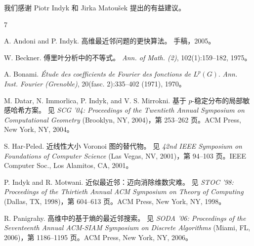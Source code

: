 \documentclass[10pt,twocolumn]{ctexart}
\begin{document}
我们感谢 Piotr Indyk 和 Jirka Matou\v{s}ek 提出的有益建议。

\begin{thebibliography}{7}

A. Andoni and P. Indyk.
高维最近邻问题的更快算法。
手稿，2005。

W. Beckner.
傅里叶分析中的不等式。
\emph{Ann. of Math. (2)}, 102(1):159--182, 1975。

A. Bonami.
\emph{Étude des coefficients de Fourier des fonctions de $L^p(G)$}.
\emph{Ann. Inst. Fourier (Grenoble)}, 20(fasc. 2):335--402 (1971), 1970。

M. Datar, N. Immorlica, P. Indyk, and V. S. Mirrokni.
基于 $p$-稳定分布的局部敏感哈希方案。
见 \emph{SCG '04: Proceedings of the Twentieth Annual Symposium on Computational Geometry} (Brooklyn, NY, 2004)，第 253--262 页。ACM Press, New York, NY, 2004。

S. Har-Peled.
近线性大小 Voronoi 图的替代物。
见 \emph{42nd IEEE Symposium on Foundations of Computer Science} (Las Vegas, NV, 2001)，第 94--103 页。IEEE Computer Soc., Los Alamitos, CA, 2001。

P. Indyk and R. Motwani.
近似最近邻：迈向消除维数灾难。
见 \emph{STOC '98: Proceedings of the Thirtieth Annual ACM Symposium on Theory of Computing} (Dallas, TX, 1998)，第 604--613 页。ACM Press, New York, NY, 1998。

R. Panigrahy.
高维中的基于熵的最近邻搜索。
见 \emph{SODA '06: Proceedings of the Seventeenth Annual ACM-SIAM Symposium on Discrete Algorithms} (Miami, FL, 2006)，第 1186--1195 页。ACM Press, New York, NY, 2006。

\end{thebibliography}
\end{document}
